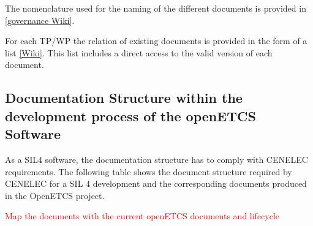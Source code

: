 \documentclass{template/openetcs_article}
\begin{document}
The nomenclature used for the naming of the different documents is provided in \href{https://github.com/openETCS/governance/wiki/Nomenclature-Guideline}{[governance Wiki]}.

For each TP/\gls{WP} the relation of existing documents is provided in the form of a list \href{https://github.com/openETCS/governance/wiki}{[Wiki]}. This list includes a direct access to the valid version of each document.

\subsection{Documentation Structure within the development process of the openETCS Software}
As a \gls{SIL}4 software, the documentation structure has to comply with CENELEC requirements. The following table shows the document structure required by CENELEC for a \gls{SIL} 4 development and the corresponding documents produced in the OpenETCS project.

\textcolor{red}{Map the documents with the current openETCS documents and lifecycle}
\end{document}
